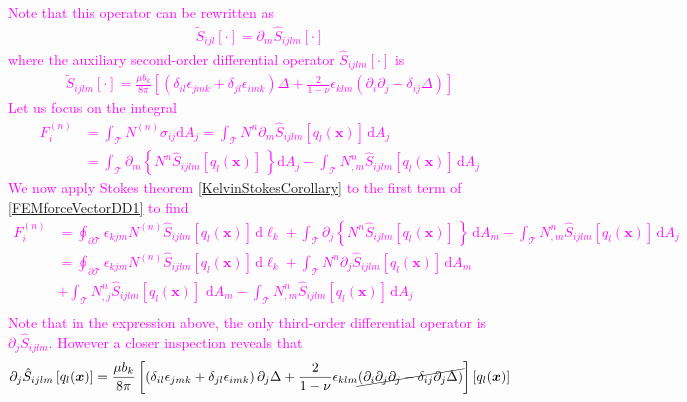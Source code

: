 \textcolor{magenta}{
Note that this operator can be rewritten as 
\begin{align}
\tilde{S}_{ijl}[\cdot]=\partial_m\hat{S}_{ijlm}[\cdot]
\end{align}
where the auxiliary second-order differential operator $\hat{S}_{ijlm}[\cdot]$ is
\begin{align}
\tilde{S}_{ijlm}[\cdot]=\frac{\mu b_k}{8\pi}\left[\left(\delta_{il}\epsilon_{jmk}+\delta_{jl}\epsilon_{imk}\right)\Delta+\frac{2}{1-\nu}\epsilon_{klm}\left(\partial_{i}\partial_j-\delta_{ij}\Delta\right)\right]
\end{align}
Let us focus on the integral
\begin{align}
F^{(n)}_{i}&=\int_\mathcal{T}N^{(n)} \sigma_{ij}\text{d}A_j
=\int_\mathcal{T}N^n \partial_m \hat{S}_{ijlm}\left[q_l(\bm x)\right]\, \text{d}A_j\nonumber\\
&=\int_\mathcal{T}\partial_m\left\{N^n  \hat{S}_{ijlm}\left[q_l(\bm x)\right]\, \right\}\text{d}A_j
-\int_\mathcal{T}N^n_{,m}  \hat{S}_{ijlm}\left[q_l(\bm x)\right]\, \text{d}A_j
\label{FEMforceVectorDD1}
\end{align}
We now apply Stokes theorem \eqref{KelvinStokesCorollary} to the first term of \eqref{FEMforceVectorDD1} to find
\begin{align}
F^{(n)}_{i}
&=
\oint_{\partial \mathcal{T}}\epsilon_{kjm}N^{(n)}\hat{S}_{ijlm}\left[q_l(\bm x)\right]\, \text{d}\ell_k
+\int_\mathcal{T}\partial_j\left\{N^n  \hat{S}_{ijlm}\left[q_l(\bm x)\right]\, \right\}\, \text{d}A_m
-\int_\mathcal{T}N^n_{,m}  \hat{S}_{ijlm}\left[q_l(\bm x)\right]\, \text{d}A_j\nonumber\\
&=
\oint_{\partial \mathcal{T}}\epsilon_{kjm}N^{(n)}\hat{S}_{ijlm}\left[q_l(\bm x)\right]\, \text{d}\ell_k
+\int_\mathcal{T} N^n  \partial_j\hat{S}_{ijlm}\left[q_l(\bm x)\right]\, \text{d}A_m\nonumber\\
&+\int_\mathcal{T}N^n_{,j}  \hat{S}_{ijlm}\left[q_l(\bm x)\right]\, \, \text{d}A_m
-\int_\mathcal{T}N^n_{,m}  \hat{S}_{ijlm}\left[q_l(\bm x)\right]\, \text{d}A_j\nonumber\\
\label{FEMforceVectorDD1}
\end{align}
Note that in the expression above, the only third-order differential operator is $\partial_j\hat{S}_{ijlm}$. However a closer inspection reveals that
\begin{align}
\partial_j\hat{S}_{ijlm}\left[q_l(\bm x)\right]
&=\frac{\mu b_k}{8\pi}\left[\left(\delta_{il}\epsilon_{jmk}+\delta_{jl}\epsilon_{imk}\right)\partial_j\Delta+\frac{2}{1-\nu}\epsilon_{klm}\cancel{\left(\partial_{i}\partial_j\partial_j-\delta_{ij}\partial_j\Delta\right)}\right]\left[q_l(\bm x)\right]\nonumber\\

\end{align}}

